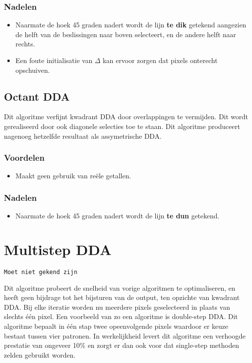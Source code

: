 \documentclass{report}
\begin{document}
	\subsubsection{Nadelen}
	\begin{itemize}
		\item Naarmate de hoek 45 graden nadert wordt de lijn \textbf{te dik} getekend aangezien de helft van de beslissingen naar boven selecteert, en de andere helft naar rechts.
		\item Een foute initialisatie van $\Delta$ kan ervoor zorgen dat pixels onterecht opschuiven.
	\end{itemize}

	\subsection{Octant DDA}
	Dit algoritme verfijnt kwadrant DDA door overlappingen te vermijden. Dit wordt gerealiseerd door ook diagonele selecties toe te staan. Dit algoritme produceert nagenoeg hetzelfde resultaat als assymetrische DDA.
	\subsubsection{Voordelen}
	\begin{itemize}
		\item Maakt geen gebruik van reële getallen.
	\end{itemize}
		\subsubsection{Nadelen}
	\begin{itemize}
		\item Naarmate de hoek 45 graden nadert wordt de lijn \textbf{te dun} getekend.
	\end{itemize}
	
	\section{Multistep DDA}
	\texttt{Moet niet gekend zijn}	
	\newline	
	
	\setlength{\parindent}{0cm} Dit algoritme probeert de snelheid van vorige algoritmen te optimaliseren, en heeft geen bijdrage tot het bijsturen van de output, ten opzichte van kwadrant DDA. Bij elke iteratie worden nu meerdere pixels geselecteerd in plaats van slechts één pixel. Een voorbeeld van zo een algoritme is double-step DDA. Dit algoritme bepaalt in één stap twee opeenvolgende pixels waardoor er keuze bestaat tussen vier patronen. In werkelijkheid levert dit algoritme een verhoogde prestatie van ongeveer 10\% en zorgt er dan ook voor dat single-step methoden zelden gebruikt worden.
	
\end{document}

